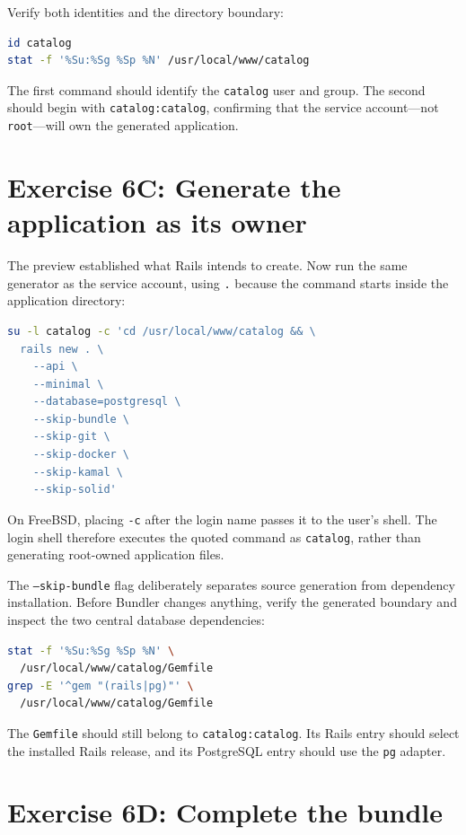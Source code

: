 Verify both identities and the directory boundary:

\begin{lstlisting}[language=sh]
id catalog
stat -f '%Su:%Sg %Sp %N' /usr/local/www/catalog
\end{lstlisting}

The first command should identify the \texttt{catalog} user and group. The
second should begin with \texttt{catalog:catalog}, confirming that the service
account---not \texttt{root}---will own the generated application.

\section{Exercise 6C: Generate the application as its owner}

The preview established what Rails intends to create. Now run the same
generator as the service account, using \texttt{.} because the command starts
inside the application directory:

\begin{lstlisting}[language=sh]
su -l catalog -c 'cd /usr/local/www/catalog && \
  rails new . \
    --api \
    --minimal \
    --database=postgresql \
    --skip-bundle \
    --skip-git \
    --skip-docker \
    --skip-kamal \
    --skip-solid'
\end{lstlisting}

On FreeBSD, placing \texttt{-c} after the login name passes it to the user's
shell. The login shell therefore executes the quoted command as
\texttt{catalog}, rather than generating root-owned application files.

The \texttt{--skip-bundle} flag deliberately separates source generation from
dependency installation. Before Bundler changes anything, verify the generated
boundary and inspect the two central database dependencies:

\begin{lstlisting}[language=sh]
stat -f '%Su:%Sg %Sp %N' \
  /usr/local/www/catalog/Gemfile
grep -E '^gem "(rails|pg)"' \
  /usr/local/www/catalog/Gemfile
\end{lstlisting}

The \texttt{Gemfile} should still belong to \texttt{catalog:catalog}. Its Rails
entry should select the installed Rails release, and its PostgreSQL entry
should use the \texttt{pg} adapter.

\section{Exercise 6D: Complete the bundle}

